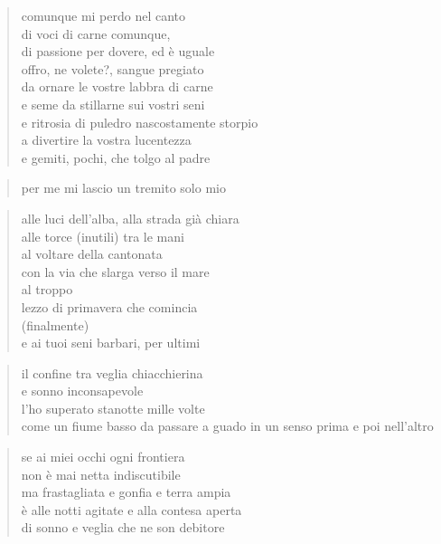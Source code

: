 \clearpage


\begin{verse}
    comunque mi perdo nel canto\\
    di voci di carne comunque,\\
    di passione per dovere, ed è uguale\\
    offro, ne volete?, sangue pregiato\\
    da ornare le vostre labbra di carne\\
    e seme da stillarne sui vostri seni\\
    e ritrosia di puledro nascostamente storpio\\
    a divertire la vostra lucentezza\\
    e gemiti, pochi, che tolgo al padre
\end{verse}

\begin{verse}
    per me mi lascio un tremito solo mio
\end{verse}

\clearpage


\begin{verse}
    alle luci dell'alba, alla strada già chiara\\
    alle torce (inutili) tra le mani\\
    al voltare della cantonata\\
    con la via che slarga verso il mare\\
    al troppo\\
    lezzo di primavera che comincia\\
    (finalmente)\\
    e ai tuoi seni barbari, per ultimi
\end{verse}

\clearpage


\begin{verse}
    il confine tra veglia chiacchierina\\
    e sonno inconsapevole\\
    l’ho superato stanotte mille volte\\
    come un fiume basso da passare a guado
    in un senso prima e poi nell’altro
\end{verse}

\begin{verse}
    se ai miei occhi ogni frontiera\\
    non è mai netta indiscutibile\\
    ma frastagliata e gonfia e terra ampia\\
    è alle notti agitate e alla contesa aperta\\
    di sonno e veglia che ne son debitore
\end{verse}

